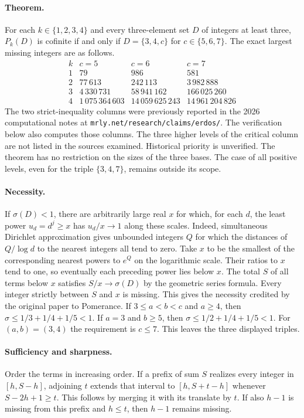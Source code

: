 \documentclass[11pt]{article}
\begin{document}
\paragraph{Theorem.}
For each $k\in\{1,2,3,4\}$ and every three-element set $D$ of
integers at least three, $P_k(D)$ is cofinite if and only if
$D=\{3,4,c\}$ for $c\in\{5,6,7\}$. The exact largest missing
integers are as follows.
\[
\begin{array}{c|r|r|r}
 k&c=5&c=6&c=7\\ \hline
 1&79&986&581\\
 2&77\,613&242\,113&3\,982\,888\\
 3&4\,330\,731&58\,941\,162&166\,025\,260\\
 4&1\,075\,364\,603&14\,059\,625\,243&14\,961\,204\,826
\end{array}
\]
The two strict-inequality columns were previously reported in the
2026 computational notes at \texttt{mrly.net/research/claims/erdos/}.
The verification below also computes those columns. The three
higher levels of the critical column are not listed in the sources
examined. Historical priority is unverified. The theorem has no
restriction on the sizes of the three bases. The case of all positive
levels, even for the triple $\{3,4,7\}$, remains outside its scope.

\paragraph{Necessity.}
If $\sigma(D)<1$, there are arbitrarily large real $x$ for which, for
each $d$, the least power $u_d=d^j\geq x$ has $u_d/x\to1$ along these
scales. Indeed, simultaneous Dirichlet approximation gives unbounded
integers $Q$ for which the distances of $Q/\log d$ to the nearest
integers all tend to zero. Take $x$ to be the smallest of the
corresponding nearest powers to $e^Q$ on the logarithmic scale.
Their ratios to $x$ tend to one, so eventually each preceding power
lies below $x$. The total $S$ of all terms below $x$ satisfies
$S/x\to\sigma(D)$ by the geometric series formula. Every integer
strictly between $S$ and $x$ is missing. This gives the necessity
credited by the original paper to Pomerance. If $3\le a<b<c$
and $a\ge4$, then $\sigma\le1/3+1/4+1/5<1$. If $a=3$ and $b\ge5$,
then $\sigma\le1/2+1/4+1/5<1$. For $(a,b)=(3,4)$ the requirement
is $c\le7$. This leaves the three displayed triples.

\paragraph{Sufficiency and sharpness.}
Order the terms in increasing order. If a prefix of sum $S$ realizes
every integer in $[h,S-h]$, adjoining $t$ extends that interval to
$[h,S+t-h]$ whenever $S-2h+1\ge t$. This follows by merging it
with its translate by $t$. If also $h-1$ is missing from this prefix
and $h\le t$, then $h-1$ remains missing.
\end{document}
